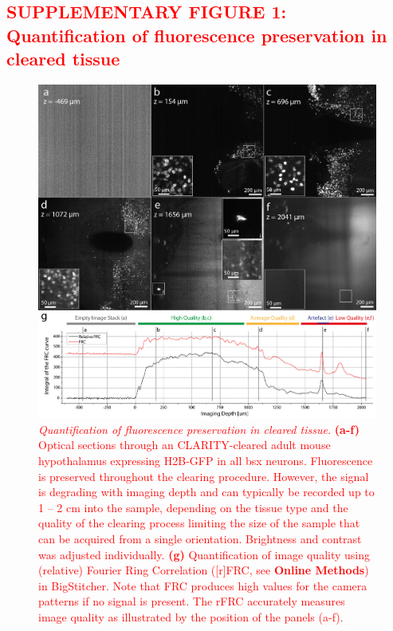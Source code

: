 \documentclass[]{spie}  %
\def\red{\textcolor{red}}
\begin{document}
\subsection*{\red{SUPPLEMENTARY FIGURE 1: Quantification of fluorescence preservation in cleared tissue}}
\vspace{1mm}
\begin{figure}[ht!]
\includegraphics[width=\textwidth]{fig-rf.jpg}
\vspace{-4.0mm}
\caption{\hspace{-0.5mm}\red{\emph{Quantification of fluorescence preservation in cleared tissue.} \textbf{(a-f)} Optical sections through an CLARITY-cleared adult mouse hypothalamus expressing H2B-GFP in all bsx neurons. Fluorescence is preserved throughout the clearing procedure. However, the signal is degrading with imaging depth and can typically be recorded up to 1 -- 2 cm into the sample, depending on the tissue type and the quality of the clearing process limiting the size of the sample that can be acquired from a single orientation. Brightness and contrast was adjusted individually. \textbf{(g)} Quantification of image quality using (relative) Fourier Ring Correlation ([r]FRC, see \textbf{Online Methods}) in BigStitcher. Note that FRC produces high values for the camera patterns if no signal is present. The rFRC accurately measures image quality as illustrated by the position of the panels (a-f).} 
}
\label{fig:sup-fig-rf}
\end{figure}
\end{document}
